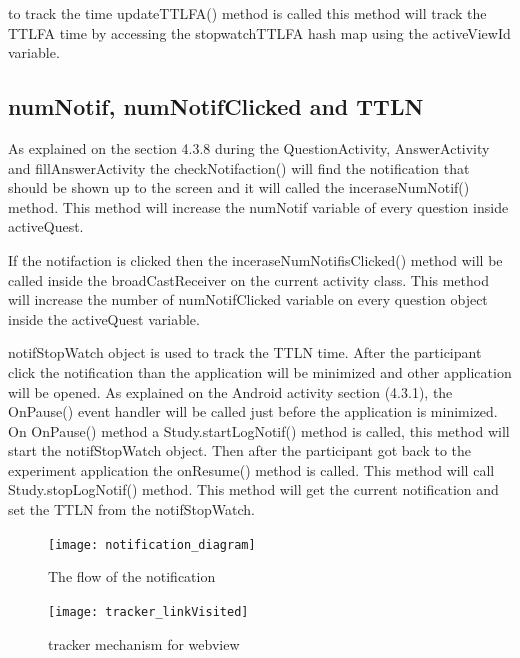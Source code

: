 to track the time updateTTLFA() method is called this method will track the TTLFA time by accessing the stopwatchTTLFA hash map using the activeViewId variable.


\subsection{numNotif, numNotifClicked and TTLN}
As explained on the section 4.3.8 during the QuestionActivity, AnswerActivity and fillAnswerActivity the checkNotifaction() will find the notification that should be shown up to the screen and it will called the inceraseNumNotif() method.
This method will increase the numNotif variable of every question inside activeQuest.

If the notifaction is clicked then the inceraseNumNotifisClicked() method will be called inside the broadCastReceiver on the current activity class. This method will increase the number of numNotifClicked variable on every question object inside the activeQuest variable.

notifStopWatch object is used to track the TTLN time. After the participant click the notification than the application will be minimized and other application will be opened. As explained on the Android activity section (4.3.1), the OnPause() event handler will be called just before the application is minimized. On OnPause() method a Study.startLogNotif() method is called, this method will start the notifStopWatch object.
Then after the participant got back to the experiment application the onResume() method is called. This method will call Study.stopLogNotif() method. This method will get the current notification and set the TTLN from the notifStopWatch.
\cite{Kliegel1984}


\begin{figure}
\begin{center}
\texttt{[image: notification\_diagram]}
\end{center}
\caption{The flow of the notification}
\label{fig:NotificationFlo}
\end{figure}

\begin{figure}
\begin{center}
\texttt{[image: tracker\_linkVisited]}
\end{center}
\caption{tracker mechanism for webview}
\label{fig:webViewTrack}
\end{figure}
